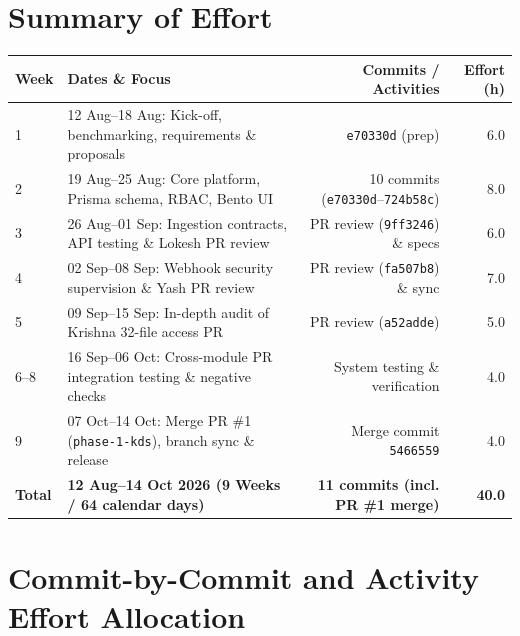 \documentclass[11pt,a4paper]{article}
\begin{document}
\section*{Summary of Effort}

\begin{table}[h]
\centering
\small
\renewcommand{\arraystretch}{1.2}
\begin{tabular}{llrr}
\toprule
\textbf{Week} & \textbf{Dates \& Focus} & \textbf{Commits / Activities} & \textbf{Effort (h)} \\
\midrule
1 & 12 Aug--18 Aug: Kick-off, benchmarking, requirements \& proposals & \texttt{e70330d} (prep) & 6.0 \\
2 & 19 Aug--25 Aug: Core platform, Prisma schema, RBAC, Bento UI & 10 commits (\texttt{e70330d}--\texttt{724b58c}) & 8.0 \\
3 & 26 Aug--01 Sep: Ingestion contracts, API testing \& Lokesh PR review & PR review (\texttt{9ff3246}) \& specs & 6.0 \\
4 & 02 Sep--08 Sep: Webhook security supervision \& Yash PR review & PR review (\texttt{fa507b8}) \& sync & 7.0 \\
5 & 09 Sep--15 Sep: In-depth audit of Krishna 32-file access PR & PR review (\texttt{a52adde}) & 5.0 \\
6--8 & 16 Sep--06 Oct: Cross-module PR integration testing \& negative checks & System testing \& verification & 4.0 \\
9 & 07 Oct--14 Oct: Merge PR \#1 (\texttt{phase-1-kds}), branch sync \& release & Merge commit \texttt{5466559} & 4.0 \\
\midrule
\textbf{Total} & \textbf{12 Aug--14 Oct 2026 (9 Weeks / 64 calendar days)} & \textbf{11 commits (incl. PR \#1 merge)} & \textbf{40.0} \\
\bottomrule
\end{tabular}
\end{table}

\section*{Commit-by-Commit and Activity Effort Allocation}
\end{document}
